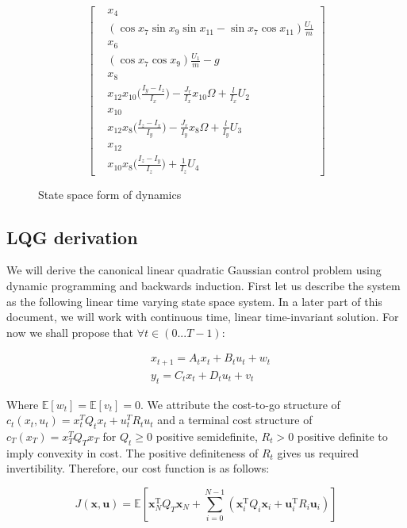 \documentclass[conf]{new-aiaa}
\begin{document}
\begin{doublespace}
\begin{singlespace}
\begin{figure}
\begin{minipage}{.4\textwidth}
\[\begin{bmatrix}
        & x_4 \\
		&(\cos x_7\sin x_9\sin x_11 - \sin x_7\cos x_11)\frac{U_1}{m} \\
		& x_6 \\
		&(\cos x_7\cos x_9)\frac{U_1}{m} -g \\
		& x_8 \\
		&x_{12} x_{10}\Big(\frac{I_y - I_z}{I_x}\Big) - \frac{J_r}{I_x}x_{10}\Omega + \frac{l}{I_x}U_2\\
		& x_{10} \\
		&x_{12} x_8 \Big(\frac{I_z - I_x}{I_y}\Big) - \frac{J_r}{I_y}x_8 \Omega + \frac{l}{I_y}U_3 \\
		& x_{12} \\
		&x_{10} x_8\Big(\frac{I_z - I_y}{I_z}\Big)+ \frac{1}{I_z}U_4
	\end{bmatrix} \]
  \end{minipage}%
\end{figure}
\begin{figure}[!h]
	\caption{State space form of dynamics}
    \label{eq2}
\end{figure}
\end{singlespace}

\subsection{LQG derivation}
We will derive the canonical linear quadratic Gaussian control problem using dynamic programming and backwards induction. First let us describe the system as the following linear time varying state space system. In a later part of this document, we will work with continuous time, linear time-invariant solution. For now we shall propose that $\forall t \in (0 ...T-1)$:
\begin{singlespace}
\begin{align}
& x_{t+1} = A_t x_t + B_t u_t + w_t \\
& y_t = C_t x_t + D_t u_t + v_t
\label{eq3}
\end{align}
\end{singlespace}


Where $\mathbb{E}[w_t]=\mathbb{E}[v_t]=0$. We attribute the cost-to-go structure of $c_t(x_t,u_t) = x_t^T Q_t x_t + u_t^T R_t u_t$ and a terminal cost structure of $c_T(x_T)= x_T^T Q_T x_T$ for $Q_t \geq 0$ positive semidefinite, $R_t > 0$ positive definite to imply convexity in cost. The positive definiteness of $R_t$ gives us required invertibility. Therefore, our cost function is as follows: 
\begin{singlespace}
\begin{equation}
{{\displaystyle J(\mathbf{x},\mathbf{u})=\mathbb {E} \left[{\mathbf {x} }_{N}^{\mathrm {T} }Q_T{\mathbf {x} }_{N}+\sum _{i=0}^{N-1}(\mathbf {x} _{i}^{\mathrm {T} }Q_{i}\mathbf {x} _{i}+\mathbf {u} _{i}^{\mathrm {T} }R_{i}\mathbf {u} _{i})\right]}}
\end{equation}
\end{singlespace}


\end{doublespace}
\end{document}
